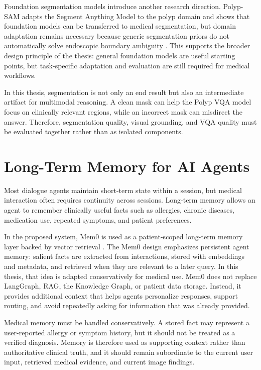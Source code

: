 Foundation segmentation models introduce another research direction. Polyp-SAM adapts the Segment Anything Model to the polyp domain and shows that foundation models can be transferred to medical segmentation, but domain adaptation remains necessary because generic segmentation priors do not automatically solve endoscopic boundary ambiguity \cite{polyp_sam}. This supports the broader design principle of the thesis: general foundation models are useful starting points, but task-specific adaptation and evaluation are still required for medical workflows.

In this thesis, segmentation is not only an end result but also an intermediate artifact for multimodal reasoning. A clean mask can help the Polyp VQA model focus on clinically relevant regions, while an incorrect mask can misdirect the answer. Therefore, segmentation quality, visual grounding, and VQA quality must be evaluated together rather than as isolated components.

\section{Long-Term Memory for AI Agents}

Most dialogue agents maintain short-term state within a session, but medical interaction often requires continuity across sessions. Long-term memory allows an agent to remember clinically useful facts such as allergies, chronic diseases, medication use, repeated symptoms, and patient preferences.

In the proposed system, Mem0 is used as a patient-scoped long-term memory layer backed by vector retrieval \cite{mem0_paper,mem0_docs_overview}. The Mem0 design emphasizes persistent agent memory: salient facts are extracted from interactions, stored with embeddings and metadata, and retrieved when they are relevant to a later query. In this thesis, that idea is adapted conservatively for medical use. Mem0 does not replace LangGraph, RAG, the Knowledge Graph, or patient data storage. Instead, it provides additional context that helps agents personalize responses, support routing, and avoid repeatedly asking for information that was already provided.

Medical memory must be handled conservatively. A stored fact may represent a user-reported allergy or symptom history, but it should not be treated as a verified diagnosis. Memory is therefore used as supporting context rather than authoritative clinical truth, and it should remain subordinate to the current user input, retrieved medical evidence, and current image findings.

